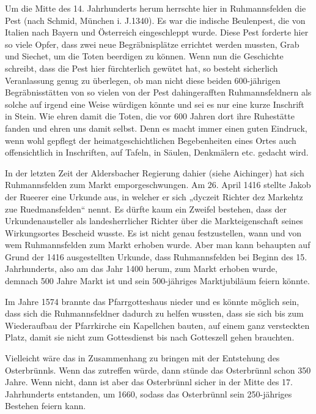 \documentclass[12pt,a4paper]{book}
\begin{document}
Um die Mitte des 14. Jahrhunderts herum herrschte hier in Ruhmannsfelden die
Pest (nach Schmid, München i. J.1340). Es war die indische Beulenpest, die von
Italien nach Bayern und Österreich eingeschleppt wurde. Diese Pest forderte hier
so viele Opfer, dass zwei neue Begräbnisplätze errichtet werden mussten, Grab
und Siechet, um die Toten beerdigen zu können. Wenn nun die Geschichte schreibt,
dass die Pest hier fürchterlich gewütet hat, so besteht sicherlich Veranlassung
genug zu überlegen, ob man nicht diese beiden 600-jährigen Begräbnisstätten von
so vielen von der Pest dahingerafften Ruhmannsfeldnern als solche auf irgend
eine Weise würdigen könnte und sei es nur eine kurze Inschrift in Stein. Wie
ehren damit die Toten, die vor 600 Jahren dort ihre Ruhestätte fanden und ehren
uns damit selbst. Denn es macht immer einen guten Eindruck, wenn wohl gepflegt
der heimatgeschichtlichen Begebenheiten eines Ortes auch offensichtlich in
Inschriften, auf Tafeln, in Säulen, Denkmälern etc. gedacht wird.

In der letzten Zeit der Aldersbacher Regierung dahier (siehe Aichinger) hat sich
Ruhmannsfelden zum Markt emporgeschwungen. Am 26. April 1416 stellte Jakob der
Rueerer eine Urkunde aus, in welcher er sich „dyczeit Richter dez Markehtz zue
Ruedmansfelden“ nennt. Es dürfte kaum ein Zweifel bestehen, dass der
Urkundenausteller als landesherrlicher Richter über die Markteigenschaft seines
Wirkungsortes Bescheid wusste. Es ist nicht genau festzustellen, wann und von
wem Ruhmannsfelden zum Markt erhoben wurde. Aber man kann behaupten auf Grund
der 1416 ausgestellten Urkunde, dass Ruhmannsfelden bei Beginn des 15.
Jahrhunderts, also am das Jahr 1400 herum, zum Markt erhoben wurde, demnach 500
Jahre Markt ist und sein 500-jähriges Marktjubiläum feiern könnte.

Im Jahre 1574 brannte das Pfarrgotteshaus nieder und es könnte möglich sein,
dass sich die Ruhmannsfeldner dadurch zu helfen wussten, dass sie sich bis zum
Wiederaufbau der Pfarrkirche ein Kapellchen bauten, auf einem ganz versteckten
Platz, damit sie nicht zum Gottesdienst bis nach Gotteszell gehen brauchten.

Vielleicht wäre das in Zusammenhang zu bringen mit der Entstehung des
Osterbrünnls. Wenn das zutreffen würde, dann stünde das Osterbrünnl schon 350
Jahre. Wenn nicht, dann ist aber das Osterbrünnl sicher in der Mitte des 17.
Jahrhunderts entstanden, um 1660, sodass das Osterbrünnl sein 250-jähriges
Bestehen feiern kann.
\end{document}
